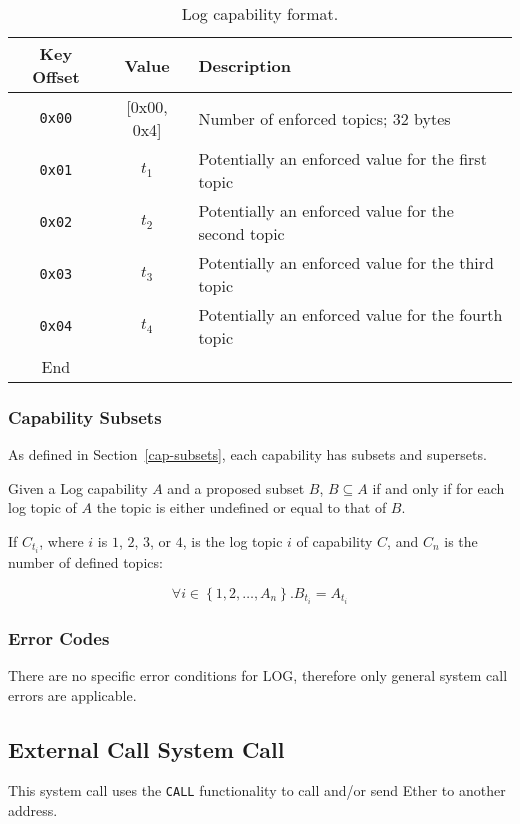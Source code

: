 \documentclass[english,a4paper]{article}
\let\oldparagraph\subsubsection
\renewcommand{\subsubsection}[1]{\oldparagraph{#1}\mbox{}}
\begin{document}
\begin{table}[H]
  \caption{Log capability format.}
  \centering{}%
  \begin{tabularx}{\textwidth}{c|c|X}
    \hline
    Key Offset & Value & Description\\
    \hline
    \hline
    \texttt{0x00} & [0x00, 0x4] & Number of enforced topics; 32 bytes \\
    \texttt{0x01} & $t_1$ & Potentially an enforced value for the first topic
      \\
    \texttt{0x02} & $t_2$ & Potentially an enforced value for the second topic
      \\
    \texttt{0x03} & $t_3$ & Potentially an enforced value for the third topic
      \\
    \texttt{0x04} & $t_4$ & Potentially an enforced value for the fourth topic
      \\
    \hline
    End &  \\
    \hline
  \end{tabularx}
\end{table}

\subsubsection{Capability Subsets}
As defined in Section~\ref{cap-subsets}, each capability has subsets and
supersets.

Given a Log capability $A$ and a proposed subset $B$, $B \subseteq A$ if and
only if for each log topic of $A$ the topic is either undefined or equal to that
of $B$.

If $C_{t_i}$, where $i$ is $1$, $2$, $3$, or $4$, is the log topic $i$ of
capability $C$, and $C_n$ is the number of defined topics:

$$ \forall i \in \left\{1,2,\dots ,A_n\right\}. B_{t_i} = A_{t_i} $$

\subsubsection{Error Codes}
There are no specific error conditions for LOG, therefore only general system
call errors are applicable.

\subsection{External Call System Call}
This system call uses the \texttt{CALL} functionality to call and/or send Ether
to another address.
\end{document}
